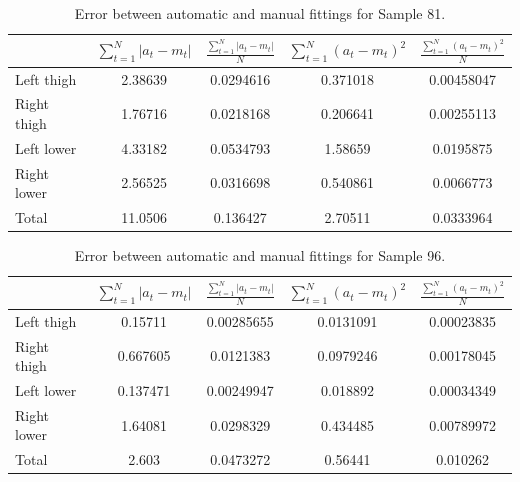 \begin{table}[thb]
	\centering
	\begin{tabular}{l|c|c|c|c}
		& $\sum_{t=1}^N \left| a_t - m_t \right|$ & $\frac{\sum_{t=1}^N \left| a_t - m_t \right|}{N}$ & $\sum_{t=1}^N \left( a_t - m_t \right)^2 $ & $\frac{\sum_{t=1}^N \left( a_t - m_t \right)^2}{N}$ \\
		\hline
		Left thigh & 2.38639 & 0.0294616 & 0.371018 &0.00458047 \\
		Right thigh & 1.76716 & 0.0218168 & 0.206641 &0.00255113 \\
		Left lower & 4.33182 & 0.0534793 & 1.58659 &0.0195875 \\
		Right lower & 2.56525 & 0.0316698 & 0.540861 &0.0066773 \\
		\hline
		Total & 11.0506 & 0.136427 & 2.70511 & 0.0333964 \\
	\end{tabular}
	\caption{Error between automatic and manual fittings for Sample 81.}
	\label{ManualFitTable81}
\end{table}

\begin{table}[thb]
	\centering
	\begin{tabular}{l|c|c|c|c}
		& $\sum_{t=1}^N \left| a_t - m_t \right|$ & $\frac{\sum_{t=1}^N \left| a_t - m_t \right|}{N}$ & $\sum_{t=1}^N \left( a_t - m_t \right)^2 $ & $\frac{\sum_{t=1}^N \left( a_ t- m_t \right)^2}{N}$ \\
		\hline
		Left thigh & 0.15711 & 0.00285655 & 0.0131091 &0.00023835 \\
		Right thigh & 0.667605 & 0.0121383 & 0.0979246 &0.00178045 \\
		Left lower & 0.137471 & 0.00249947 & 0.018892 &0.00034349 \\
		Right lower & 1.64081 & 0.0298329 & 0.434485 &0.00789972 \\
		\hline
		Total & 2.603 & 0.0473272 & 0.56441 & 0.010262 \\
	\end{tabular}
	\caption{Error between automatic and manual fittings for Sample 96.}
	\label{ManualFitTable96}
\end{table}

